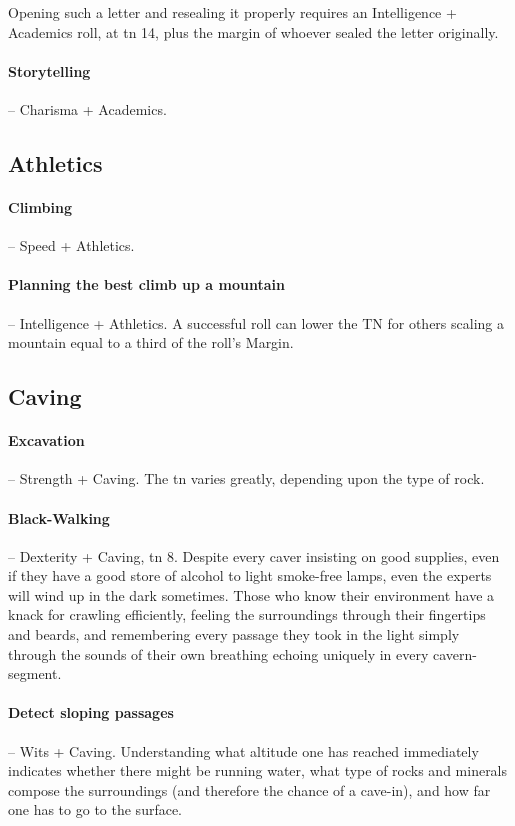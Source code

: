 \begin{multicols}{2}
Opening such a letter and resealing it properly requires an Intelligence + Academics roll, at \gls{tn} 14, plus the margin of whoever sealed the letter originally.

\paragraph{Storytelling} -- Charisma + Academics.

\subsection{Athletics}

\paragraph{Climbing} -- Speed + Athletics.

\paragraph{Planning the best climb up a mountain} -- Intelligence + Athletics.
A successful roll can lower the TN for others scaling a mountain equal to a third of the roll's Margin.

\subsection{Caving}

\paragraph{Excavation} -- Strength + Caving.
The \gls{tn} varies greatly, depending upon the type of rock.

\paragraph{Black-Walking} -- Dexterity + Caving, \gls{tn} 8.
Despite every caver insisting on good supplies, even if they have a good store of alcohol to light smoke-free lamps, even the experts will wind up in the dark sometimes.
Those who know their environment have a knack for crawling efficiently, feeling the surroundings through their fingertips and beards, and remembering every passage they took in the light simply through the sounds of their own breathing echoing uniquely in every cavern-segment.

\paragraph{Detect sloping passages} -- Wits + Caving.
Understanding what altitude one has reached immediately indicates whether there might be running water, what type of rocks and minerals compose the surroundings (and therefore the chance of a cave-in), and how far one has to go to the surface.


\end{multicols}
